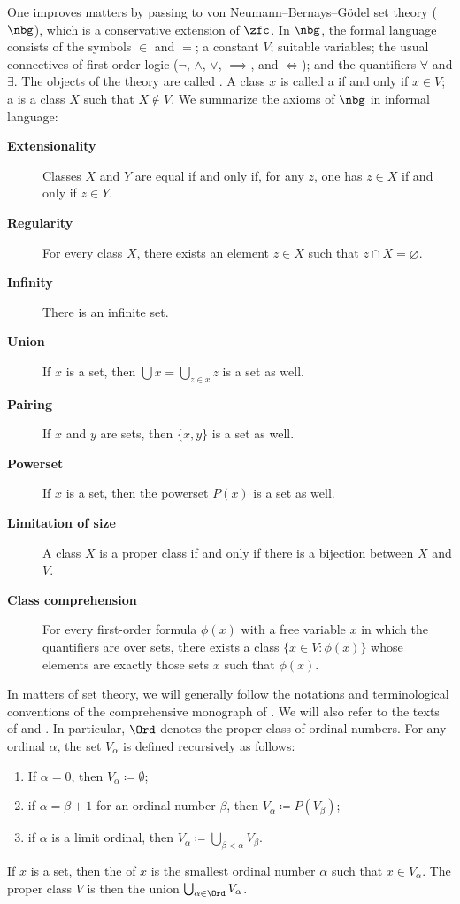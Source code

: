One improves matters by passing to von Neumann--Bernays--Gödel set theory ($\nbg$),
which is a conservative extension of $\zfc$.
In $ \nbg $, the formal language consists of the symbols $\in$ and $=$;
a constant $V$; suitable variables;
the usual connectives of first-order logic ($\neg$, $\wedge$, $\vee$, $\implies$, and $\iff$);
and the quantifiers $\forall$ and $\exists$.
The objects of the theory are called .
A class $ x $ is called a  if and only if $x \in V$;
a  is a class $ X $ such that $ X \notin V $.
We summarize the axioms of $ \nbg $ in informal language:
\begin{description}
	\item[\textbf{Extensionality}] Classes $ X $ and $ Y $ are equal if and only if,
		for any $ z $, one has $ z \in X $ if and only if $ z \in Y $.
	\item[\textbf{Regularity}] For every class $ X $,
		there exists an element $ z \in X $ such that $ z \cap X = \varnothing $.
	\item[\textbf{Infinity}] There is an infinite set.
	\item[\textbf{Union}] If $ x $ is a set, then $ \bigcup x = \bigcup_{z \in x} z $ is a set as well.
	\item[\textbf{Pairing}] If $ x $ and $ y $ are sets, then $ \{x,y\} $ is a set as well.
	\item[\textbf{Powerset}] If $ x $ is a set, then the powerset $ P(x) $ is a set as well.
	\item[\textbf{Limitation of size}] A class $X$ is a proper class if and only if
		there is a bijection between $X$ and $V$.
	\item[\textbf{Class comprehension}] For every first-order formula $ \phi(x) $ with a free variable $ x $ in which the quantifiers are over sets,
		there exists a class $ \{ x \in V : \phi(x) \} $ whose elements are exactly those sets $ x $ such that $ \phi(x) $.
\end{description}

In matters of set theory,
we will generally follow the notations and terminological conventions
of the comprehensive monograph of \cite{Jech2003}.
We will also refer to the texts of \cite{Drake1974} and \cite{Kanamori2009}.
In particular, $ \Ord $ denotes the proper class of ordinal numbers.
For any ordinal $ \alpha $, the set $ V_{\alpha} $ is defined recursively as follows:
\begin{enumerate}
	\item If $ \alpha = 0 $, then $ V_{\alpha} \coloneq \emptyset $;
	\item if $ \alpha = \beta + 1 $ for an ordinal number $ \beta $, then $ V_{\alpha} \coloneq P(V_{\beta}) $;
	\item if $ \alpha $ is a limit ordinal, then $ V_{\alpha} \coloneq \bigcup_{\beta < \alpha} V_{\beta} $.
\end{enumerate}
If $ x $ is a set, then the  of $ x $ is the smallest ordinal number $ \alpha $ such that $ x \in V_{\alpha} $.
The proper class $ V $ is then the union $ \bigcup_{\alpha \in \Ord} V_{\alpha} $.

